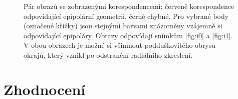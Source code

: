 \documentclass[11pt,oneside,a4paper,pdftex]{article}   %
\begin{document}
	\begin{figure}[htb]
			\centering
		\caption{Pár obrazů se zobrazenými korespondencemi: červeně korespondence odpovídající
			epipolární geometrii, černě chybné. Pro vybrané body (označené křížky) jsou
			stejnými barvami znázorněny vzájemně si odpovídající epipoláry. Obrazy
			odpovídají snímkům \ref{fig:i0} a \ref{fig:i1}. V obou obrazech je možné
			si všimnout podduškovitého obrysu okrajů, který vznikl po odstranění
			radiálního zkreslení.}
		\label{fig:pairWithEpipolars}
	\end{figure}

\section{Zhodnocení}




%


\end{document}
